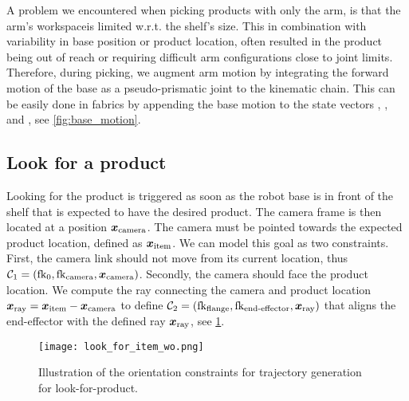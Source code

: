 A problem we encountered when picking products with only the arm, is that the arm's workspaceis limited w.r.t. the shelf's size. This in combination with variability in base position or product location, often resulted in the product being out of reach or requiring difficult arm configurations close to joint limits.
Therefore, during picking, we augment arm motion by integrating the forward motion of the base as a pseudo-prismatic joint to the kinematic chain. This can be easily done in \ac{fabrics} by appending the base motion to the state vectors \q{}, \qdot{}, and \qddot{}, see \cref{fig:base_motion}. 


\subsection{Look for a product}
\label{sub:look_for_product}
Looking for the product is triggered as soon as the robot
base is in front of the shelf that is expected to
have the desired product. The camera frame is then located
at a position $\bm{x}_{\textrm{camera}}$. The camera
must be pointed towards the expected product location, defined as
$\bm{x}_{\textrm{item}}$. We can model this goal as two
constraints. First, the camera link should not move from its
current location, thus $\mathcal{C}_1 =
(\textrm{fk}_{\textrm{0}},\textrm{fk}_{\textrm{camera}},\bm{x}_{\textrm{camera}})$. Secondly, the
camera should face the product location. We  compute the
ray connecting the camera and product location
$\bm{x}_{\textrm{ray}} = \bm{x}_{\textrm{item}} - \bm{x}_{\textrm{camera}}$ to 
define $\mathcal{C}_2 = (\textrm{fk}_{\textrm{flange}}, \textrm{fk}_{\textrm{end-effector}},  \bm{x}_{\textrm{ray}})$
that aligns the end-effector with the
defined ray $\bm{x}_{\textrm{ray}}$, see
\cref{fig:look_for_product}.

\begin{figure}
  \begin{center}
    \texttt{[image: look\_for\_item\_wo.png]}
  \end{center}
  \caption{Illustration of the orientation constraints for trajectory
  generation for look-for-product.}
  \label{fig:look_for_product}
\end{figure}


